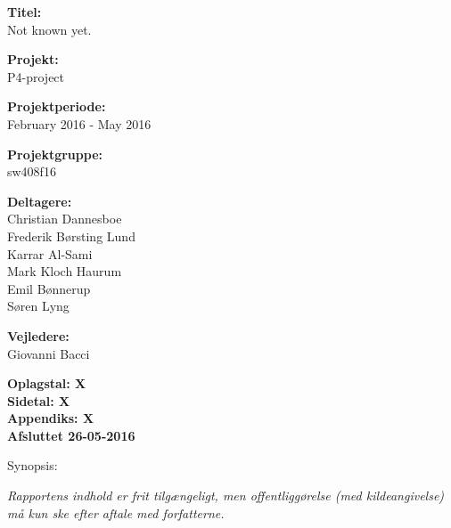 \begin{minipage}[t]{0.48\textwidth}
\textbf{Titel:} \\[5pt]\bigskip\hspace{2ex}
Not known yet.

\textbf{Projekt:} \\[5pt]\bigskip\hspace{2ex}
P4-project

\textbf{Projektperiode:} \\[5pt]\bigskip\hspace{2ex}
February 2016 - May 2016

\textbf{Projektgruppe:} \\[5pt]\bigskip\hspace{2ex}
sw408f16	

\textbf{Deltagere:} \\[5pt]\hspace*{2ex}
Christian Dannesboe \\\hspace*{2ex}
Frederik Børsting Lund \\\hspace*{2ex}
Karrar Al-Sami \\\hspace*{2ex}
Mark Kloch Haurum \\\hspace*{2ex}
Emil Bønnerup \\\hspace*{2ex}
Søren Lyng 

\textbf{Vejledere:} \\[5pt]\hspace*{2ex}
Giovanni Bacci

\vspace*{1cm}

\textbf{Oplagstal: X} \\
\textbf{Sidetal: X} \\
\textbf{Appendiks: X} \\ 
\textbf{Afsluttet 26-05-2016}

\end{minipage}
\hfill
\begin{minipage}[t]{0.483\textwidth}
Synopsis: \\[5pt]
\fbox{\parbox{7cm}{\bigskip\bigskip}}
\end{minipage}

\vfill

{\footnotesize\itshape Rapportens indhold er frit tilgængeligt, men offentliggørelse (med kildeangivelse) må kun ske efter aftale med forfatterne.}

